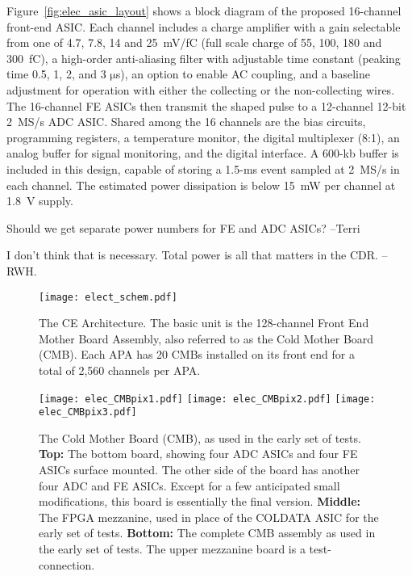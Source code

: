Figure~\ref{fig:elec_asic_layout} shows a block diagram of the proposed 16-channel front-end ASIC.
Each channel includes a charge amplifier with a gain selectable from one of 4.7, 7.8, 14 and 25~mV/fC
(full scale charge of 55, 100, 180 and 300~fC),
a high-order anti-aliasing filter with adjustable time
constant (peaking time 0.5, 1, 2, and 3 $\mathrm{\mu}$s),
an option to enable AC coupling,
and a baseline adjustment for operation with either the collecting or the non-collecting wires.
The 16-channel FE ASICs then transmit the shaped pulse to a 12-channel 12-bit 2~MS/s ADC ASIC.
Shared among the 16 channels are the bias circuits, programming registers,
a temperature monitor, the digital multiplexer (8:1),
an analog buffer for signal monitoring, and the digital interface.
A 600-kb buffer is included in this design, capable of storing a 1.5-ms 
event sampled at 2~MS/s in each channel.
The estimated power dissipation is below 15~mW per channel at 1.8~V supply.

\begin{editornote}
  Should we get separate power numbers for FE and ADC ASICs? --Terri

  I don't think that is necessary.  Total power is all that matters in the CDR.  -- RWH.
\end{editornote}

\begin{figure}[htbp]
\centering
\texttt{[image: elect\_schem.pdf]}
\caption{
  The CE Architecture.
  The basic unit is the 128-channel Front End Mother Board Assembly, also referred to as the Cold Mother Board (CMB).
  Each APA has 20 CMBs installed on its front end for a total of 2,560 channels per APA.
}
\label{fig:elect_schem}
\end{figure}

\begin{figure}[htbp]
\centering
\texttt{[image: elec\_CMBpix1.pdf]}
\texttt{[image: elec\_CMBpix2.pdf]}
\texttt{[image: elec\_CMBpix3.pdf]}
\caption{
  The Cold Mother Board (CMB), as used in the early set of tests.
  {\bf Top:} The bottom board, showing four ADC ASICs and four FE ASICs surface mounted.
  The other side of the board has another four ADC and FE ASICs.
  Except for a few anticipated small modifications, this board is essentially the final version.
  {\bf Middle:} The FPGA mezzanine, used in place of the COLDATA ASIC for the early set of tests.
  {\bf Bottom:} The complete CMB assembly as used in the early set of tests.
  The upper mezzanine board is a test-connection.
}
\label{fig:elec_CMBpix}
\end{figure}

